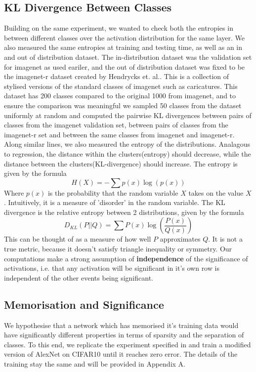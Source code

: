 \documentclass{article}
\begin{document}
        \subsection{KL Divergence Between Classes}
            Building on the same experiment, we wanted to check both the entropies in between different classes over the activation distribution for the same layer. We also measured the same entropies at training and testing time, as well as an in and out of distribution dataset. The in-distribution dataset was the validation set for imagenet as used eariler, and the out of distribution dataset was fixed to be the imagenet-r dataset created by Hendrycks et. al.\cite{hendrycks2021facesrobustnesscriticalanalysis}. This is a collection of stylised versions of the standard classes of imagenet such as caricatures. This dataset has 200 classes compared to the original 1000 from imagenet, and to ensure the comparison was meaningful we sampled 50 classes from the dataset uniformly at random and computed the pairwise KL divergences between pairs of classes from the imagenet validation set, between pairs of classes from the imagenet-r set and between the same classes from imagenet and imagenet-r. Along similar lines, we also measured the entropy of the distributions. Analagous to regression, the distance within the clusters(entropy) should decrease, while the distance between the clusters(KL-divergence) should increase. The entropy is given by the formula
            \[H(X) = -\sum p(x)\log(p(x))\]
            Where $p(x)$ is the probability that the random variable $X$ takes on the value $X$. Intuitively, it is a measure of 'disorder' in the random variable. The KL divergence is the relative entropy between 2 distributions, given by the formula 
            \[D_{KL}(P||Q) = \sum P(x)\log(\frac{P(x)}{Q(x)})\]
            This can be thought of as a measure of how well $P$ approximates $Q$. It is not a true metric, because it doesn't satisfy triangle inequality or symmetry. Our computations make a strong assumption of \textbf{independence} of the significance of activations, i.e. that any activation will be significant in it's own row is independent of the other events being significant. 
        
        \subsection{Memorisation and Significance}
            We hypothesise that a network which has memorised it's training data would have significantly different properties in terms of sparsity and the separation of classes. To this end, we replicate the experiment specified in \cite{zhang2017understandingdeeplearningrequires} and train a modified version of AlexNet on CIFAR10 until it reaches zero error. The details of the training stay the same and will be provided in Appendix A. 
        
\end{document}
